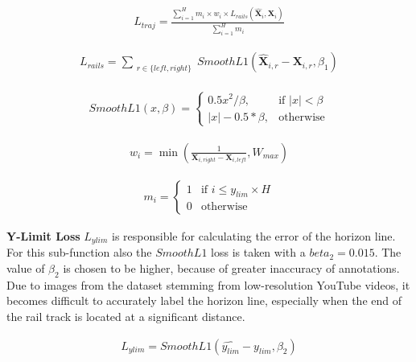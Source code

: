 \begin{align}
    L_{traj} = \frac{\sum_{i=1}^H m_{i} \times w_{i} \times L_{rails}(\hat{\mathbf{X}}_{i},\mathbf{X}_{i})}
    {\sum_{i=1}^H m_{i}}
    \label{func:trajectoryLoss}
\end{align}

\begin{align}
    L_{rails} = \sum_{\substack{r \in \{left, right\}}} SmoothL1(\hat{\mathbf{X}}_{i,r} - \mathbf{X}_{i,r}, \beta_1)
    \label{func:smoothL1_error}
\end{align}

\begin{align}
    SmoothL1(x, \beta) = 
    \begin{cases}
        0.5 x^2 / \beta, & \text{if } |x| < \beta \\
        |x| - 0.5 * \beta, & \text{otherwise}
    \end{cases}
    \label{func:smoothL1}
\end{align}

\begin{align}
    w_{i} = \min \left( \frac{1}{\mathbf{X}_{i,right} - \mathbf{X}_{i,left}} , W_{max} \right)
    \label{func:perspective_weight}
\end{align}

\begin{align}
    m_i = 
    \begin{cases} 
        1 & \text{if } i \leq y_{lim} \times H \\
        0 & \text{otherwise}
    \end{cases}
    \label{func:maskingFactor}
\end{align}

\textbf{Y-Limit Loss} $L_{ylim}$ is responsible for calculating the error of the horizon line.
For this sub-function also the $SmoothL1$ loss is taken with a $beta_{2} = 0.015$.
The value of $\beta_{2}$ is chosen to be higher, because of greater inaccuracy of annotations.
Due to images from the dataset stemming from low-resolution YouTube videos, it becomes difficult to accurately label the horizon line, especially when the end of the rail track is located at a significant distance.

\begin{align}
    L_{ylim} = SmoothL1(\hat{y_{lim}} - y_{lim}, \beta_{2})
    \label{func:ylimLoss}
\end{align}

